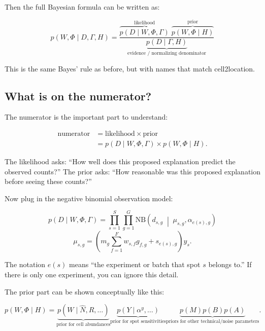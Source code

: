 \documentclass[11pt]{article}
\newcommand{\NB}{\mathrm{NB}}
\begin{document}
Then the full Bayesian formula can be written as:

\begin{mathbox}
\[
\boxed{
p(W,\Phi \mid D,\Gamma,H)
=
\frac{
\overbrace{p(D\mid W,\Phi,\Gamma)}^{\text{likelihood}}
\;\overbrace{p(W,\Phi\mid H)}^{\text{prior}}
}{
\underbrace{p(D\mid \Gamma,H)}_{\text{evidence / normalizing denominator}}
}
}
\]
\end{mathbox}

This is the same Bayes' rule as before, but with names that match cell2location.

\subsection{What is on the numerator?}

The numerator is the important part to understand:

\begin{mathbox}
\[
\begin{aligned}
\text{numerator}
&= \text{likelihood}\times\text{prior} \\
&= p(D\mid W,\Phi,\Gamma)\times p(W,\Phi\mid H).
\end{aligned}
\]

The likelihood asks: ``How well does this proposed explanation predict the observed counts?''
The prior asks: ``How reasonable was this proposed explanation before seeing these counts?''
\end{mathbox}

Now plug in the negative binomial observation model:

\begin{mathbox}
\[
\boxed{
p(D\mid W,\Phi,\Gamma)
=
\prod_{s=1}^{S}\prod_{g=1}^{G}
\NB\!\left(
 d_{s,g}\;\middle|\;
 \mu_{s,g},\alpha_{e(s),g}
\right)
}
\]
\[
\boxed{
\mu_{s,g}
=
\left(
 m_g\sum_{f=1}^{F}w_{s,f}g_{f,g}+s_{e(s),g}
\right)y_s.
}
\]
\end{mathbox}

The notation \(e(s)\) means ``the experiment or batch that spot \(s\) belongs to.'' If there is only one experiment, you can ignore this detail.

The prior part can be shown conceptually like this:

\begin{mathbox}
\[
p(W,\Phi\mid H)
=
\underbrace{p(W\mid \hat N,R,\ldots)}_{\text{prior for cell abundances}}
\underbrace{p(Y\mid \alpha^y,\ldots)}_{\text{prior for spot sensitivities}}
\underbrace{p(M)p(B)p(A)}_{\text{priors for other technical/noise parameters}}.
\]
\end{mathbox}
\end{document}
